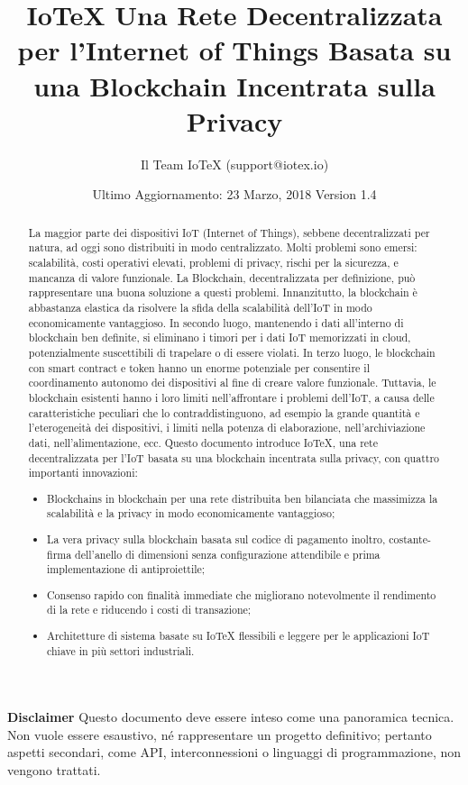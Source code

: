 \documentclass[a4paper,12pt]{article}
\title{
	IoTeX
	\linebreak
	\Large Una Rete Decentralizzata per l'Internet of Things
	\linebreak
	\Large Basata su una Blockchain Incentrata sulla Privacy}
\author{Il Team IoTeX (support@iotex.io)}
\date{Ultimo Aggiornamento: 23 Marzo, 2018
	\linebreak Version 1.4
	}
\begin{document}
\maketitle

\vspace{120pt}


\textbf{Disclaimer} Questo documento deve essere inteso come una panoramica tecnica. Non vuole essere esaustivo, né rappresentare un progetto definitivo; pertanto aspetti secondari, come API, interconnessioni o linguaggi di programmazione, non vengono trattati.

\pagebreak

\begin{abstract}
	La maggior parte dei dispositivi IoT (Internet of Things), sebbene decentralizzati per natura, ad oggi sono distribuiti in modo centralizzato. Molti problemi sono emersi: scalabilità, costi operativi elevati, problemi di privacy, rischi per la sicurezza, e mancanza di valore funzionale. La Blockchain, decentralizzata per definizione, può rappresentare una buona soluzione a questi problemi. Innanzitutto, la blockchain è abbastanza elastica da risolvere la sfida della scalabilità dell'IoT in modo economicamente vantaggioso. In secondo luogo, mantenendo i dati all'interno di blockchain ben definite, si eliminano i timori per i dati IoT memorizzati in cloud, potenzialmente suscettibili di trapelare o di essere violati. In terzo luogo, le blockchain con smart contract e token hanno un enorme potenziale per consentire il coordinamento autonomo dei dispositivi al fine di creare valore funzionale. Tuttavia, le blockchain esistenti hanno i loro limiti nell'affrontare i problemi dell'IoT, a causa delle caratteristiche peculiari che lo contraddistinguono, ad esempio la grande quantità e l'eterogeneità dei dispositivi, i limiti nella potenza di elaborazione, nell'archiviazione dati, nell'alimentazione, ecc.
	Questo documento introduce IoTeX, una rete decentralizzata per l'IoT basata su una blockchain incentrata sulla privacy, con quattro importanti innovazioni:

	\begin{itemize}

		\item
		      Blockchains in blockchain per una rete distribuita ben bilanciata che massimizza la scalabilità e la privacy in modo economicamente vantaggioso;

		\item
		      La vera privacy sulla blockchain basata sul codice di pagamento inoltro, costante- firma dell'anello di dimensioni senza configurazione attendibile e prima implementazione di antiproiettile;

		\item
		      Consenso rapido con finalità immediate che migliorano notevolmente il rendimento di la rete e riducendo i costi di transazione;

		\item
		      Architetture di sistema basate su IoTeX flessibili e leggere per le applicazioni IoT chiave in più settori industriali.

	\end{itemize}

\end{abstract}
\end{document}
